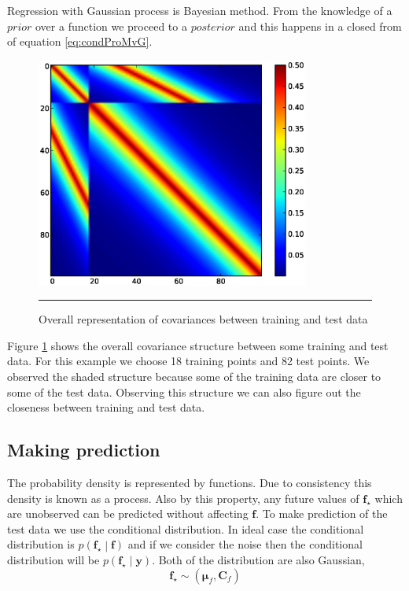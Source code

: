 Regression with Gaussian process is Bayesian method. From the knowledge of a $prior$ over a function we proceed to a
$posterior$ and this happens in a closed from of equation \ref{eq:condProMvG}. 

\begin{figure}[t]
	\centering
		\includegraphics[width=0.8\textwidth,keepaspectratio]{diagrams/Cov_Structure.eps}
		\rule{35em}{0.5pt}
	\caption[Overall representation of covariances between training and test data]
		{Overall representation of covariances between training and test data}
	\label{fig:Covariances_Structure}
\end{figure}

Figure \ref{fig:Covariances_Structure} shows the overall covariance structure between some training and test data.
For this example we choose 18 training points and 82 test points. We observed the shaded structure because some of
the training data are closer to some of the test data. Observing this structure we can also figure out the closeness
between training and test data. 

\subsection{Making prediction}
The probability density is represented by functions. Due to consistency this density is known as a process. Also by this
property, any future values of $\mathbf{f_\star}$ which are unobserved can be predicted without affecting $\mathbf{f}$.
To make prediction of the test data we use the conditional distribution. In ideal case the conditional distribution
is $ p\left( \mathbf{f_\star} \middle| \mathbf{f} \right) $ and if we consider the noise then the conditional distribution
will be $ p\left( \mathbf{f_\star} \middle| \mathbf{y} \right) $. Both of the distribution are also Gaussian,
\begin{equation} \label{eq:prediction}
  \mathbf{f_\star}  \sim \left( \boldsymbol{\mu}_f, \mathbf{C}_f \right)
\end{equation}

